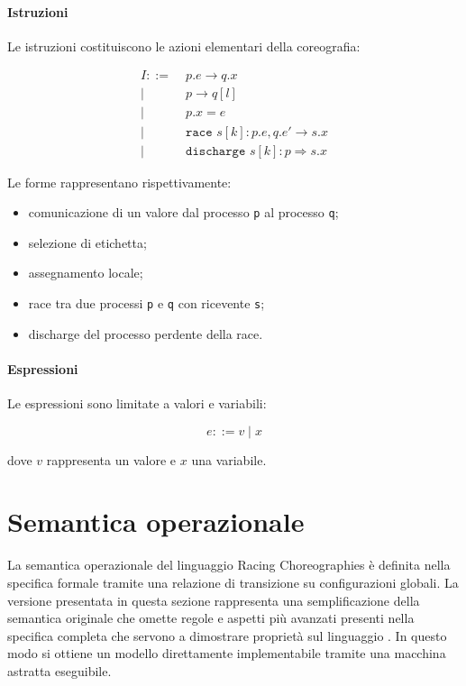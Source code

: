 \paragraph{Istruzioni}

Le istruzioni costituiscono le azioni elementari della coreografia:

\[
\begin{aligned}
I ::= \;& p.e \rightarrow q.x \\
   \mid\;& p \rightarrow q[l] \\
   \mid\;& p.x = e \\
   \mid\;& \texttt{race } s[k] : p.e , q.e' \rightarrow s.x \\
   \mid\;& \texttt{discharge } s[k] : p \Rightarrow s.x
\end{aligned}
\]

Le forme rappresentano rispettivamente:

\begin{itemize}
\item comunicazione di un valore dal processo \texttt{p} al processo \texttt{q};
\item selezione di etichetta;
\item assegnamento locale;
\item race tra due processi \texttt{p} e \texttt{q} con ricevente \texttt{s};
\item discharge del processo perdente della race.
\end{itemize}

\paragraph{Espressioni}

Le espressioni sono limitate a valori e variabili:

\[
e ::= v \mid x
\]

dove \(v\) rappresenta un valore e \(x\) una variabile.

\section{Semantica operazionale}

La semantica operazionale del linguaggio Racing Choreographies è definita nella specifica formale tramite una relazione di transizione su configurazioni globali. La versione presentata in questa sezione rappresenta una semplificazione della semantica originale che omette regole e aspetti più avanzati presenti nella specifica completa che servono a dimostrare proprietà sul linguaggio \cite{racingdraft}. In questo modo si ottiene un modello direttamente implementabile tramite una macchina astratta eseguibile.

